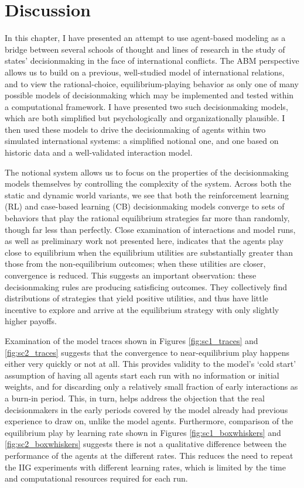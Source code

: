 \section{Discussion}\label{discussion}

In this chapter, I have presented an attempt to use agent-based modeling as a bridge between several schools of thought and lines of research in the study of states' decisionmaking in the face of international conflicts. The ABM perspective allows us to build on a previous, well-studied model of international relations, and to view the rational-choice, equilibrium-playing behavior as only one of many possible models of decisionmaking which may be implemented and tested within a computational framework. I have presented two such decisionmaking models, which are both simplified but psychologically and organizationally plausible. I then used these models to drive the decisionmaking of agents within two simulated international systems: a simplified notional one, and one based on historic data and a well-validated interaction model.

The notional system allows us to focus on the properties of the decisionmaking models themselves by controlling the complexity of the system. Across both the static and dynamic world variants, we see that both the reinforcement learning (RL) and case-based learning (CB) decisionmaking models converge to sets of behaviors that play the rational equilibrium strategies far more than randomly, though far less than perfectly. Close examination of interactions and model runs, as well as preliminary work not presented here, indicates that the agents play close to equilibrium when the equilibrium utilities are substantially greater than those from the non-equilibrium outcomes; when these utilities are closer, convergence is reduced. This suggests an important observation: these decisionmaking rules are producing satisficing outcomes. They collectively find distributions of strategies that yield positive utilities, and thus have little incentive to explore and arrive at the equilibrium strategy with only slightly higher payoffs. 

Examination of the model traces shown in Figures \ref{fig:sc1_traces} and \ref{fig:sc2_traces} suggests that the convergence to near-equilibrium play happens either very quickly or not at all. This provides validity to the model's `cold start' assumption of having all agents start each run with no information or initial weights, and for discarding only a relatively small fraction of early interactions as a burn-in period. This, in turn, helps address the objection that the real decisionmakers in the early periods covered by the model already had previous experience to draw on, unlike the model agents. Furthermore, comparison of the equilibrium play by learning rate shown in Figures \ref{fig:sc1_boxwhiskers} and \ref{fig:sc2_boxwhiskers} suggests there is not a qualitative difference between the performance of the agents at the different rates. This reduces the need to repeat the IIG experiments with different learning rates, which is limited by the time and computational resources required for each run.

